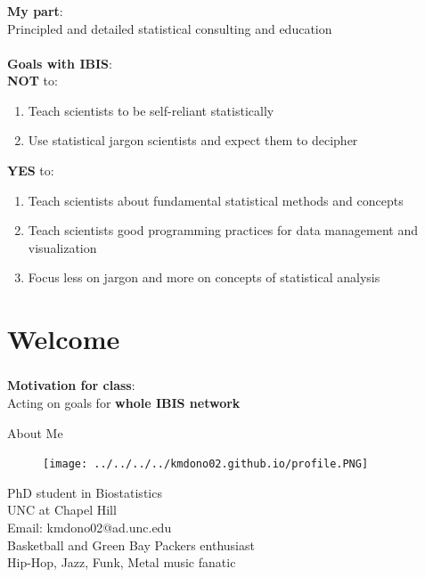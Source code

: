 \documentclass[xcolor=dvipsnames]{beamer}
\begin{document}
\begin{frame}
\frametitle{\insertsectionhead}
\textbf{My part}:\\
Principled and detailed statistical consulting and education\\~\\

\textbf{Goals with IBIS}:\\
\textbf{NOT} to:
\begin{enumerate}
\item Teach scientists to be self-reliant statistically
\item Use statistical jargon scientists and expect them to decipher
\end{enumerate}
\textbf{YES} to:
\begin{enumerate}
\item Teach scientists about fundamental statistical methods and concepts
\item Teach scientists good programming practices for data management and visualization
\item Focus less on jargon and more on concepts of statistical analysis
\end{enumerate}
\end{frame}

\section{Welcome}
\begin{frame}
\frametitle{\insertsectionhead}
\textbf{Motivation for class}:\\
Acting on goals for \textbf{whole IBIS network}

\begin{exampleblock}{About Me}
\begin{figure}
\texttt{[image: ../../../../kmdono02.github.io/profile.PNG]}
\end{figure}
PhD student in Biostatistics\\
UNC at Chapel Hill\\
Email: kmdono02@ad.unc.edu\\
Basketball and Green Bay Packers enthusiast\\
Hip-Hop, Jazz, Funk, Metal music fanatic
\end{exampleblock}
\end{frame}
\end{document}
